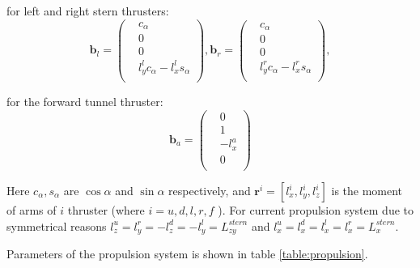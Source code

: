\documentclass[a0,portrait]{a0poster}
\begin{document}
\begin{minipage}[t]{0.48\linewidth}
\begin{multicols}{2}
for left and right stern thrusters:
\begin{equation*}
\boldsymbol{b}_l = \left( \begin{array}{cc}
& c_{\alpha} \\
& 0 \\
& 0 \\
& l_y^l c_{\alpha} - l_x^l s_{\alpha} \\
\end{array}
\right),
\boldsymbol{b}_r = \left( \begin{array}{cc}
& c_{\alpha} \\
& 0 \\
& 0 \\
& l_y^r c_{\alpha} - l_x^r s_{\alpha} \\
\end{array}
\right),
\end{equation*}

for the forward tunnel thruster:
\begin{equation*}
\boldsymbol{b}_a = \left( \begin{array}{cc}
& 0        \\
& 1        \\
& -l_x^a   \\
& 0        \\
\end{array}
\right)
\end{equation*}

Here $c_{\alpha}, s_{\alpha}$ are $\cos{\alpha}$ and $\sin{\alpha}$ respectively, and $\boldsymbol{r}^i = [l_x^i, l_y^i, l_z^i]$ is the moment of arms of $i$ thruster (where $i = u,d,l,r,f$ ). For current propulsion system due to symmetrical reasons $l_z^u = l_y^r = -l_z^d = -l_y^l = L_{zy}^{stern}$ and $l_x^u=l_x^d=l_x^l=l_x^r = L_{x}^{stern}$.

Parameters of the propulsion system is shown in table \ref{table:propulsion}.


\end{multicols}
\end{minipage}
\end{document}
